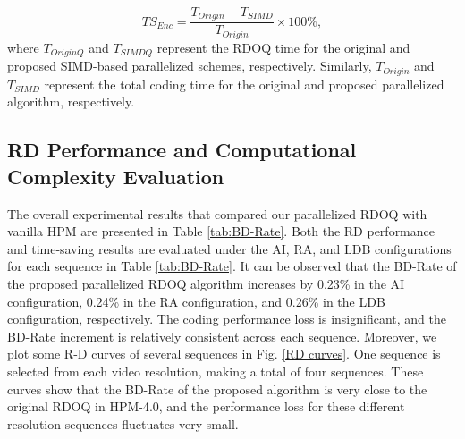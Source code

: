 \documentclass[lettersize,journal]{IEEEtran}
\begin{document}
\begin{equation}
	\label{TSEnc}
	TS_{Enc} = \frac{T_{Origin}-T_{SIMD}}{T_{Origin}} \times 100\%,
\end{equation}
where $T_{OriginQ}$ and $T_{SIMDQ}$ represent the RDOQ time for the original and proposed SIMD-based parallelized schemes, respectively. Similarly, $T_{Origin}$ and $T_{SIMD}$ represent the total coding time for the original and proposed parallelized algorithm, respectively. 

\subsection{RD Performance and Computational Complexity Evaluation}
The overall experimental results that compared our parallelized RDOQ with vanilla HPM are presented in Table \ref{tab:BD-Rate}. Both the RD performance and time-saving results are evaluated under the AI, RA, and LDB configurations for each sequence in Table \ref{tab:BD-Rate}. It can be observed that the BD-Rate of the proposed parallelized RDOQ algorithm increases by 0.23\% in the AI configuration, 0.24\% in the RA configuration, and 0.26\% in the LDB configuration, respectively. The coding performance loss is insignificant, and the BD-Rate increment is relatively consistent across each sequence. Moreover, we plot some R-D curves of several sequences in Fig. \ref{RD curves}. One sequence is selected from each video resolution, making a total of four sequences. These curves show that the BD-Rate of the proposed algorithm is very close to the original RDOQ in HPM-4.0, and the performance loss for these different resolution sequences fluctuates very small. 
\end{document}
